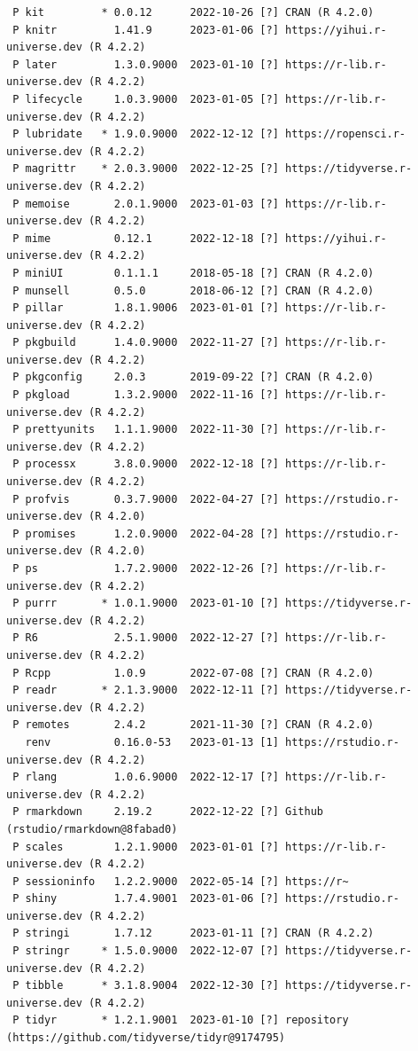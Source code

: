\documentclass[
  super,
  preprint,
  3p]{elsarticle}
\begin{document}
\begin{verbatim}
 P kit         * 0.0.12      2022-10-26 [?] CRAN (R 4.2.0)
 P knitr         1.41.9      2023-01-06 [?] https://yihui.r-universe.dev (R 4.2.2)
 P later         1.3.0.9000  2023-01-10 [?] https://r-lib.r-universe.dev (R 4.2.2)
 P lifecycle     1.0.3.9000  2023-01-05 [?] https://r-lib.r-universe.dev (R 4.2.2)
 P lubridate   * 1.9.0.9000  2022-12-12 [?] https://ropensci.r-universe.dev (R 4.2.2)
 P magrittr    * 2.0.3.9000  2022-12-25 [?] https://tidyverse.r-universe.dev (R 4.2.2)
 P memoise       2.0.1.9000  2023-01-03 [?] https://r-lib.r-universe.dev (R 4.2.2)
 P mime          0.12.1      2022-12-18 [?] https://yihui.r-universe.dev (R 4.2.2)
 P miniUI        0.1.1.1     2018-05-18 [?] CRAN (R 4.2.0)
 P munsell       0.5.0       2018-06-12 [?] CRAN (R 4.2.0)
 P pillar        1.8.1.9006  2023-01-01 [?] https://r-lib.r-universe.dev (R 4.2.2)
 P pkgbuild      1.4.0.9000  2022-11-27 [?] https://r-lib.r-universe.dev (R 4.2.2)
 P pkgconfig     2.0.3       2019-09-22 [?] CRAN (R 4.2.0)
 P pkgload       1.3.2.9000  2022-11-16 [?] https://r-lib.r-universe.dev (R 4.2.2)
 P prettyunits   1.1.1.9000  2022-11-30 [?] https://r-lib.r-universe.dev (R 4.2.2)
 P processx      3.8.0.9000  2022-12-18 [?] https://r-lib.r-universe.dev (R 4.2.2)
 P profvis       0.3.7.9000  2022-04-27 [?] https://rstudio.r-universe.dev (R 4.2.0)
 P promises      1.2.0.9000  2022-04-28 [?] https://rstudio.r-universe.dev (R 4.2.0)
 P ps            1.7.2.9000  2022-12-26 [?] https://r-lib.r-universe.dev (R 4.2.2)
 P purrr       * 1.0.1.9000  2023-01-10 [?] https://tidyverse.r-universe.dev (R 4.2.2)
 P R6            2.5.1.9000  2022-12-27 [?] https://r-lib.r-universe.dev (R 4.2.2)
 P Rcpp          1.0.9       2022-07-08 [?] CRAN (R 4.2.0)
 P readr       * 2.1.3.9000  2022-12-11 [?] https://tidyverse.r-universe.dev (R 4.2.2)
 P remotes       2.4.2       2021-11-30 [?] CRAN (R 4.2.0)
   renv          0.16.0-53   2023-01-13 [1] https://rstudio.r-universe.dev (R 4.2.2)
 P rlang         1.0.6.9000  2022-12-17 [?] https://r-lib.r-universe.dev (R 4.2.2)
 P rmarkdown     2.19.2      2022-12-22 [?] Github (rstudio/rmarkdown@8fabad0)
 P scales        1.2.1.9000  2023-01-01 [?] https://r-lib.r-universe.dev (R 4.2.2)
 P sessioninfo   1.2.2.9000  2022-05-14 [?] https://r~
 P shiny         1.7.4.9001  2023-01-06 [?] https://rstudio.r-universe.dev (R 4.2.2)
 P stringi       1.7.12      2023-01-11 [?] CRAN (R 4.2.2)
 P stringr     * 1.5.0.9000  2022-12-07 [?] https://tidyverse.r-universe.dev (R 4.2.2)
 P tibble      * 3.1.8.9004  2022-12-30 [?] https://tidyverse.r-universe.dev (R 4.2.2)
 P tidyr       * 1.2.1.9001  2023-01-10 [?] repository (https://github.com/tidyverse/tidyr@9174795)

\end{verbatim}
\end{document}
